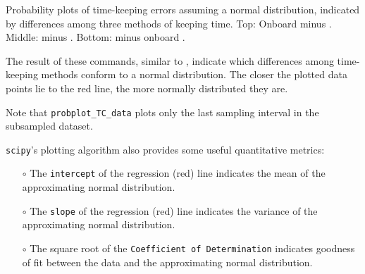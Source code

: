 \begin{enumerate}
\begin{marginfigure}[-19.cm]
\begin{center}
		\caption[Probability plots of time-keeping errors]{Probability plots of time-keeping errors assuming a normal distribution, indicated by differences among three methods of keeping time.
			Top: Onboard \rtc minus  \rtc. Middle: \ntp minus  \rtc. Bottom: \ntp minus onboard \rtc. }
	\end{center}
\end{marginfigure}
	The result of these commands, similar to , indicate which differences among time-keeping methods conform to a normal distribution.
	The closer the plotted data points lie to the red line, the more normally distributed they are.
	
	\smallskip
	Note that \lstinline{probplot_TC_data} plots only the last sampling interval in the subsampled dataset. 
	
	\smallskip
	\texttt{scipy}'s plotting algorithm also provides some useful quantitative metrics:
	\begin{itemize}
		\item[$\circ$] The \texttt{intercept} of the regression (red) line indicates the mean of the approximating normal distribution.
		\item[$\circ$] The \texttt{slope} of the regression (red) line indicates the variance of the approximating normal distribution.
		\item[$\circ$] The square root of the \texttt{Coefficient of Determination} indicates goodness of fit between the data and the approximating normal distribution.
	\end{itemize}
	

\end{enumerate}
